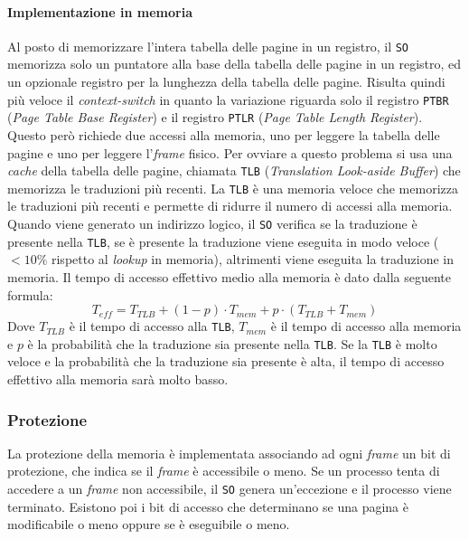             \paragraph{Implementazione in memoria} 
                Al posto di memorizzare l'intera tabella delle pagine in un registro, il \texttt{SO} memorizza solo un puntatore alla base della tabella delle pagine in un registro, ed un opzionale registro per la lunghezza della tabella delle pagine. Risulta quindi più veloce il \textit{context-switch} in quanto la variazione riguarda solo il registro \texttt{PTBR} (\textit{Page Table Base Register}) e il registro \texttt{PTLR} (\textit{Page Table Length Register}). Questo però richiede due accessi alla memoria, uno per leggere la tabella delle pagine e uno per leggere l'\textit{frame} fisico. Per ovviare a questo problema si usa una \textit{cache} della tabella delle pagine, chiamata \texttt{TLB} (\textit{Translation Look-aside Buffer}) che memorizza le traduzioni più recenti. La \texttt{TLB} è una memoria veloce che memorizza le traduzioni più recenti e permette di ridurre il numero di accessi alla memoria. Quando viene generato un indirizzo logico, il \texttt{SO} verifica se la traduzione è presente nella \texttt{TLB}, se è presente la traduzione viene eseguita in modo veloce ($<10\%$ rispetto al \textit{lookup} in memoria), altrimenti viene eseguita la traduzione in memoria. \newline
                Il tempo di accesso effettivo medio alla memoria è dato dalla seguente formula:
                \begin{equation*}
                    T_{eff} = T_{TLB} + (1 - p) \cdot T_{mem} + p \cdot (T_{TLB} + T_{mem})
                \end{equation*}
                Dove $T_{TLB}$ è il tempo di accesso alla \texttt{TLB}, $T_{mem}$ è il tempo di accesso alla memoria e $p$ è la probabilità che la traduzione sia presente nella \texttt{TLB}. Se la \texttt{TLB} è molto veloce e la probabilità che la traduzione sia presente è alta, il tempo di accesso effettivo alla memoria sarà molto basso.
        \subsubsection{Protezione}
            La protezione della memoria è implementata associando ad ogni \textit{frame} un bit di protezione, che indica se il \textit{frame} è accessibile o meno. Se un processo tenta di accedere a un \textit{frame} non accessibile, il \texttt{SO} genera un'eccezione e il processo viene terminato. Esistono poi i bit di accesso che determinano se una pagina è modificabile o meno oppure se è eseguibile o meno.

